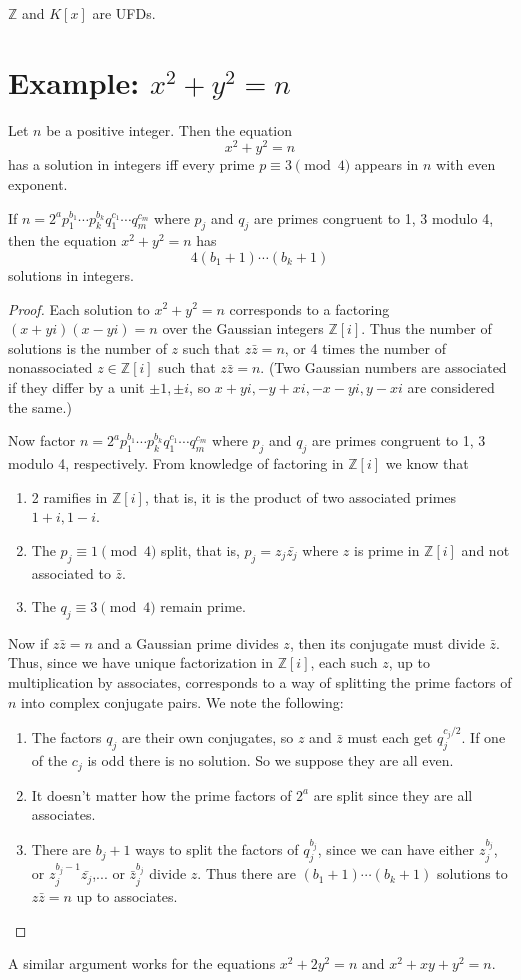 \begin{cor}
$\mathbb Z$ and $K[x]$ are UFDs.
\end{cor}
\section{Example: $x^2+y^2=n$}
\begin{thm}\label{number-sum-of-squares}
Let $n$ be a positive integer. Then the equation 
\[x^2+y^2=n\]
has a solution in integers iff every prime $p\equiv 3\pmod 4$ appears in $n$ with even exponent.

If $ n=2^ap_1^{b_1}\cdots p_k^{b_k}q_1^{c_1}\cdots q_m^{c_m}$ where $ p_j$ and $ q_j$ are primes congruent to 1, 3 modulo 4, then the equation $x^2+y^2=n$ has
\[4(b_1+1)\cdots (b_k+1)\]
solutions in integers.
\end{thm}
\begin{proof}
Each solution to $ x^2+y^2=n$ corresponds to a factoring $ (x+yi)(x-yi)=n$ over the Gaussian integers $ \mathbb Z[i]$. Thus the number of solutions is the number of $ z$ such that $ z\bar{z}=n$, or 4 times the number of nonassociated $ z\in \mathbb Z[i]$ such that $ z\bar{z}=n$. (Two Gaussian numbers are associated if they differ by a unit $ \pm 1, \pm i$, so $ x+yi, -y+xi, -x-yi, y-xi$ are considered the same.)

Now factor $ n=2^ap_1^{b_1}\cdots p_k^{b_k}q_1^{c_1}\cdots q_m^{c_m}$ where $ p_j$ and $ q_j$ are primes congruent to 1, 3 modulo 4, respectively. From knowledge of factoring in $ \mathbb{Z}[i]$ we know that
\begin{enumerate}
\item 2 ramifies in $ \mathbb Z[i]$, that is, it is the product of two associated primes $ 1+i,1-i$.
\item The $ p_j\equiv 1\pmod 4$ split, that is, $ p_j=z_j\bar{z_j}$ where $ z$ is prime in $ \mathbb{Z}[i]$ and not associated to $ \bar z$.
\item The $ q_j\equiv 3\pmod 4$ remain prime.
\end{enumerate}
Now if $ z\bar z=n$ and a Gaussian prime divides $ z$, then its conjugate must divide $ \bar z$. Thus, since we have unique factorization in $ \mathbb{Z}[i]$, each such $ z$, up to multiplication by associates, corresponds to a way of splitting the prime factors of $ n$ into complex conjugate pairs. We note the following:
\begin{enumerate}
\item The factors $ q_j$ are their own conjugates, so $ z$ and $ \bar z$ must each get $ q_j^{c_j/2}$. If one of the $ c_j$ is odd there is no solution. So we suppose they are all even.
\item It doesn't matter how the prime factors of $ 2^a$ are split since they are all associates.
\item There are $ b_j+1$ ways to split the factors of $ q_j^{b_j}$, since we can have either $ z_j^{b_j}$, or $ z_j^{b_j-1}\bar{z_j}$,... or $ \bar z_j^{b_j}$ divide $ z$. Thus there are $ (b_1+1)\cdots (b_k+1)$ solutions to $ z\bar z=n$ up to associates.
\end{enumerate}
\end{proof}
A similar argument works for the equations $x^2+2y^2=n$ and $x^2+xy+y^2=n$.

